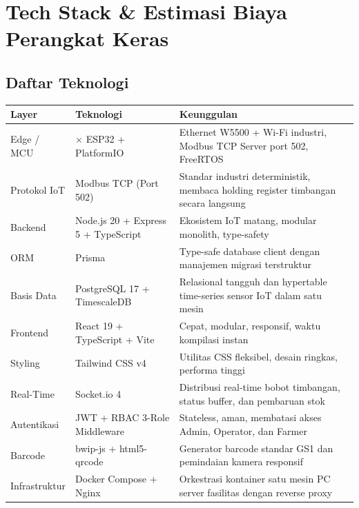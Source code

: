\documentclass[12pt,a4paper]{article}
\begin{document}
\section{Tech Stack \& Estimasi Biaya Perangkat Keras}

\subsection{Daftar Teknologi}
\begin{longtable}{@{}>{\raggedright\arraybackslash}p{3.2cm}>{\raggedright\arraybackslash}p{4.6cm}>{\raggedright\arraybackslash}p{7.2cm}@{}}
\toprule
\textbf{Layer} & \textbf{Teknologi} & \textbf{Keunggulan} \\
\midrule
\endhead
Edge / MCU & 3$\times$ ESP32 + PlatformIO & Ethernet W5500 + Wi-Fi industri, Modbus TCP Server port 502, FreeRTOS \\
Protokol IoT & Modbus TCP (Port 502) & Standar industri deterministik, membaca holding register timbangan secara langsung \\
Backend & Node.js 20 + Express 5 + TypeScript & Ekosistem IoT matang, modular monolith, type-safety \\
ORM & Prisma & Type-safe database client dengan manajemen migrasi terstruktur \\
Basis Data & PostgreSQL 17 + TimescaleDB & Relasional tangguh dan hypertable time-series sensor IoT dalam satu mesin \\
Frontend & React 19 + TypeScript + Vite & Cepat, modular, responsif, waktu kompilasi instan \\
Styling & Tailwind CSS v4 & Utilitas CSS fleksibel, desain ringkas, performa tinggi \\
Real-Time & Socket.io 4 & Distribusi real-time bobot timbangan, status buffer, dan pembaruan stok \\
Autentikasi & JWT + RBAC 3-Role Middleware & Stateless, aman, membatasi akses Admin, Operator, dan Farmer \\
Barcode & bwip-js + html5-qrcode & Generator barcode standar GS1 dan pemindaian kamera responsif \\
Infrastruktur & Docker Compose + Nginx & Orkestrasi kontainer satu mesin PC server fasilitas dengan reverse proxy \\
\bottomrule
\end{longtable}
\end{document}
